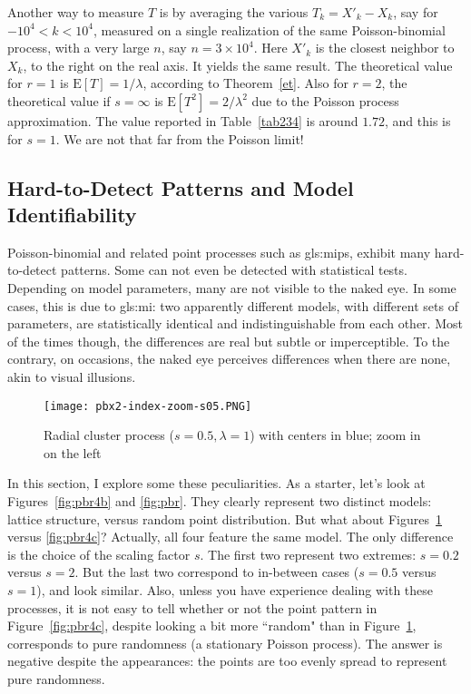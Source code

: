 \documentclass[10pt]{article}
\begin{document}
Another way to measure $T$ is by averaging the various $T_k=X'_k-X_k$, say for $-10^4 < k < 10^4$,  measured on a single realization of the same Poisson-binomial process, with a very large $n$, say $n=3\times 10^4$. Here $X'_k$ is the closest neighbor to $X_k$, to the right on the real axis. It yields the same result. The theoretical value for $r=1$ is $\mbox{E}[T]=1/\lambda$, according to Theorem~\ref{et}. Also for $r=2$, the theoretical value if $s=\infty$ is $\mbox{E}[T^2]=2/\lambda^2$ due to the Poisson process approximation. The value reported in Table~\ref{tab234} is around $1.72$, and this is for $s=1$. We are not that far from the Poisson limit!



\subsection{Hard-to-Detect Patterns and Model Identifiability}\label{hardid}

Poisson-binomial and related point processes such as \glspl{gls:mip}, exhibit many hard-to-detect patterns. Some can not even be detected with statistical tests. Depending on model parameters, many are not visible to the naked eye. In some cases, this is due to \gls{gls:mi}: two apparently different models, with different sets of parameters, are
statistically identical and indistinguishable from each other.  Most of the times though, the differences are real but subtle or imperceptible. To the contrary, on occasions, the naked eye perceives differences when there are none, akin to visual illusions.   

\begin{figure}[H]
\centering
\texttt{[image: pbx2-index-zoom-s05.PNG]} %
\caption{Radial cluster process ($s=0.5, \lambda=1$) with centers in blue; zoom in on the left}
\label{fig:pbr4}
\end{figure}

In this section, I explore some these peculiarities. As a starter, let's look at Figures~\ref{fig:pbr4b} and \ref{fig:pbr}. They clearly represent two distinct models: lattice structure, versus random point distribution.  But what about
Figures~\ref{fig:pbr4} versus \ref{fig:pbr4c}? Actually, all four feature the same model. The only difference is the choice of the scaling factor $s$. The first two represent 
 two extremes: $s=0.2$ versus $s=2$. But the last two correspond to in-between cases ($s=0.5$ versus $s=1$), and look similar. Also, unless you have experience dealing with these processes, it is not easy to tell whether or not the point pattern in Figure~\ref{fig:pbr4c}, despite looking a bit more ``random" than in Figure~\ref{fig:pbr4},  corresponds to pure randomness (a stationary Poisson process). The answer is negative despite the appearances: the points are too evenly spread to represent pure
 randomness. 
\end{document}
